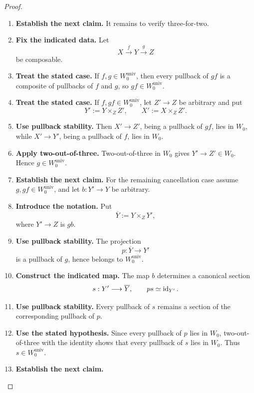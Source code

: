 \begin{proof}
\begin{enumerate}[label=\textup{(\arabic*)}]
    We use the arrow-category
    characterization of strong saturation from
    \cite[Section~5.5.4]{LurieHigherToposTheory}.
    \item \textbf{Establish the next claim.}
    It remains to verify three-for-two.
    \item \textbf{Fix the indicated data.}
    Let
    \[
    X\xrightarrow{f}Y\xrightarrow{g}Z
    \]
    be composable.
    \item \textbf{Treat the stated case.}
    If \(f,g\in W_0^{\mathrm{univ}}\), then every pullback of
    \(gf\) is a composite of pullbacks of \(f\) and \(g\), so
    \(gf\in W_0^{\mathrm{univ}}\).
    \item \textbf{Treat the stated case.}
    If \(f,gf\in W_0^{\mathrm{univ}}\), let \(Z'\to Z\) be arbitrary and put
    \[
    Y':=Y\times_ZZ',
    \qquad
    X':=X\times_ZZ'.
    \]
    \item \textbf{Use pullback stability.}
    Then \(X'\to Z'\), being a pullback of \(gf\), lies in \(W_0\), while
    \(X'\to Y'\), being a pullback of \(f\), lies in \(W_0\).
    \item \textbf{Apply two-out-of-three.}
    Two-out-of-three
    in \(W_0\) gives \(Y'\to Z'\in W_0\).
    Hence
    \(g\in W_0^{\mathrm{univ}}\).
    \item \textbf{Establish the next claim.}
    For the remaining cancellation case assume
    \(g,gf\in W_0^{\mathrm{univ}}\), and let \(b:Y'\to Y\) be arbitrary.
    \item \textbf{Introduce the notation.}
    Put
    \[
    \overline Y:=Y\times_ZY',
    \]
    where \(Y'\to Z\) is \(gb\).
    \item \textbf{Use pullback stability.}
    The projection
    \[
    p:\overline Y\longrightarrow Y'
    \]
    is a pullback of \(g\), hence belongs to
    \(W_0^{\mathrm{univ}}\).
    \item \textbf{Construct the indicated map.}
    The map \(b\) determines a canonical section
    \[
    s:Y'\longrightarrow\overline Y,
    \qquad
    ps\simeq\operatorname{id}_{Y'}.
    \]
    \item \textbf{Use pullback stability.}
    Every pullback of \(s\) remains a section of the corresponding pullback of
    \(p\).
    \item \textbf{Use the stated hypothesis.}
    Since every pullback of \(p\) lies in \(W_0\), two-out-of-three with
    the identity shows that every pullback of \(s\) lies in \(W_0\).
    Thus
    \(s\in W_0^{\mathrm{univ}}\).
    \item \textbf{Establish the next claim.}

\end{enumerate}
\end{proof}
